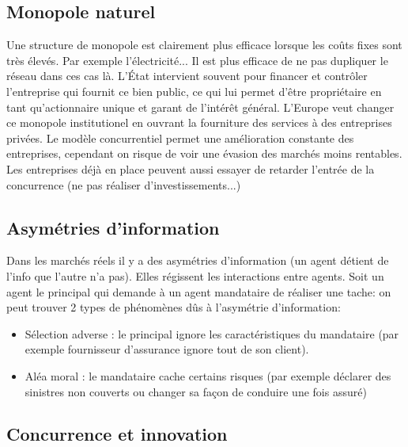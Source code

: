 \subsection{Monopole naturel} %
\label{sec:monopole_naturel}

Une structure de monopole est clairement plus efficace lorsque les coûts fixes sont très élevés. Par exemple l'électricité... Il est plus efficace de ne pas dupliquer le réseau dans ces cas là. L'État intervient souvent pour financer et contrôler l'entreprise qui fournit ce bien public, ce qui lui permet d'être propriétaire en tant qu'actionnaire unique et garant de l'intérêt général. L'Europe veut changer ce monopole institutionel en ouvrant la fourniture des services à des entreprises privées. Le modèle concurrentiel permet une amélioration constante des entreprises, cependant on risque de voir une évasion des marchés moins rentables. Les entreprises déjà en place peuvent aussi essayer de retarder l'entrée de la concurrence (ne pas réaliser d'investissements...)


\subsection{Asymétries d'information} %
\label{sec:asymetries_d_information}

Dans les marchés réels il y a des asymétries d'information (un agent détient de l'info que l'autre n'a pas). Elles régissent les interactions entre agents. Soit un agent le principal qui demande à un agent mandataire de réaliser une tache: on peut trouver 2 types de phénomènes dûs à l'asymétrie d'information:
\begin{itemize}
	\item Sélection adverse : le principal ignore les caractéristiques du mandataire (par exemple fournisseur d'assurance ignore tout de son client).
	\item Aléa moral : le mandataire cache certains risques (par exemple déclarer des sinistres non couverts ou changer sa façon de conduire une fois assuré)
\end{itemize}
\subsection{Concurrence et innovation} %
\label{sec:concurrence_et_innovation}

